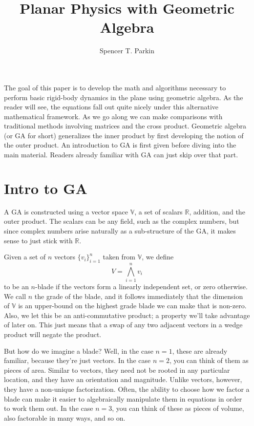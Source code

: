 \documentclass[12pt]{article}
\title{Planar Physics with Geometric Algebra}
\author{Spencer T. Parkin}
\newcommand{\R}{\mathbb{R}}
\newcommand{\V}{\mathbb{V}}
\begin{document}
\maketitle

The goal of this paper is to develop the math and algorithms necessary to perform basic rigid-body dynamics in the plane
using geometric algebra.  As the reader will see, the equations fall out quite nicely under this alternative
mathematical framework.  As we go along we can make comparisons with traditional methods involving
matrices and the cross product.  Geometric algebra (or GA for short) generalizes the inner product by first
developing the notion of the outer product.  An introduction to GA is first given before diving into the
main material.  Readers already familiar with GA can just skip over that part.

\section{Intro to GA}

A GA is constructed using a vector space $\V$, a set of scalars $\R$, addition, and the outer product.  The scalars can be any field,
such as the complex numbers, but since complex numbers arise naturally as a sub-structure of the GA, it makes sense
to just stick with $\R$.

Given a set of $n$ vectors $\{v_i\}_{i=1}^n$ taken from $\V$, we define
\begin{equation}
V = \bigwedge_{i=1}^n v_i
\end{equation}
to be an $n$-blade if the vectors form a linearly independent set, or zero otherwise.
We call $n$ the grade of the blade, and it follows immediately that the dimension of $\V$
is an upper-bound on the highest grade blade we can make that is non-zero.
Also, we let this be an anti-commutative product; a property we'll take advantage of
later on.  This just means that a swap of any two adjacent vectors in a wedge product
will negate the product.

But how do we imagine a blade?  Well, in the case $n=1$, these are already familiar,
because they're just vectors.  In the case $n=2$, you can think of them as pieces
of area.  Similar to vectors, they need not be rooted in any particular location, and
they have an orientation and magnitude.  Unlike vectors, however, they have a non-unique
factorization.  Often, the ability to choose how we factor a blade can make it easier
to algebraically manipulate them in equations in order to work them out.  In the case $n=3$,
you can think of these as pieces of volume, also factorable in many ways, and so on.
\end{document}
